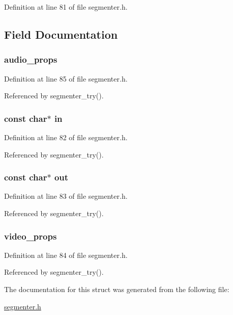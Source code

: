 \-Definition at line 81 of file segmenter.\-h.



\subsection{\-Field \-Documentation}
\hypertarget{struct_params_a219b79cb42ef34f697906a8d8366c947}{
\subsubsection[{audio\-\_\-props}]{ {\bf audio\-\_\-props}}}\label{struct_params_a219b79cb42ef34f697906a8d8366c947}


\-Definition at line 85 of file segmenter.\-h.



\-Referenced by segmenter\-\_\-try().

\hypertarget{struct_params_a52bb50fce643c4899922808db7d60d42}{
\subsubsection[{in}]{\setlength{\rightskip}{0pt plus 5cm}const char$\ast$ {\bf in}}}\label{struct_params_a52bb50fce643c4899922808db7d60d42}


\-Definition at line 82 of file segmenter.\-h.



\-Referenced by segmenter\-\_\-try().

\hypertarget{struct_params_a8905de849f303a8598c0f7c3d37d46ed}{
\subsubsection[{out}]{\setlength{\rightskip}{0pt plus 5cm}const char$\ast$ {\bf out}}}\label{struct_params_a8905de849f303a8598c0f7c3d37d46ed}


\-Definition at line 83 of file segmenter.\-h.



\-Referenced by segmenter\-\_\-try().

\hypertarget{struct_params_ae8e5c5323efdf97ec1e66866b906f813}{
\subsubsection[{video\-\_\-props}]{ {\bf video\-\_\-props}}}\label{struct_params_ae8e5c5323efdf97ec1e66866b906f813}


\-Definition at line 84 of file segmenter.\-h.



\-Referenced by segmenter\-\_\-try().



\-The documentation for this struct was generated from the following file\-:\begin{DoxyCompactItemize}
\item 
\hyperlink{segmenter_8h}{segmenter.\-h}\end{DoxyCompactItemize}
